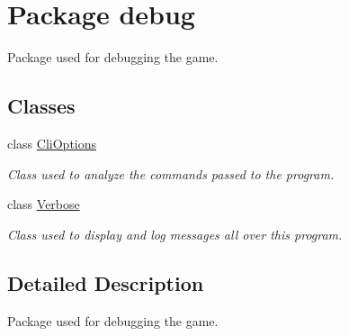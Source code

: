 \hypertarget{namespacedebug}{\section{Package debug}
\label{namespacedebug}
}


Package used for debugging the game.  


\subsection*{Classes}
\begin{DoxyCompactItemize}
\item 
class \hyperlink{classdebug_1_1_cli_options}{Cli\-Options}
\begin{DoxyCompactList}\small\item\em Class used to analyze the commands passed to the program. \end{DoxyCompactList}\item 
class \hyperlink{classdebug_1_1_verbose}{Verbose}
\begin{DoxyCompactList}\small\item\em Class used to display and log messages all over this program. \end{DoxyCompactList}\end{DoxyCompactItemize}


\subsection{Detailed Description}
Package used for debugging the game. 